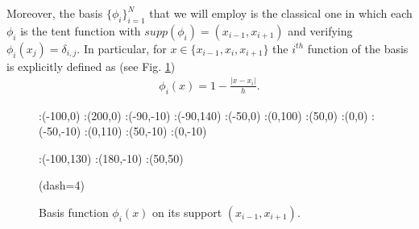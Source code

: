 Moreover, the basis $\big\{\phi_i\big\}_{i=1}^N$ that we will employ is the classical one in which each $\phi_i$ is the tent function with $supp(\phi_i)=(x_{i-1},x_{i+1})$ and verifying $\phi_i(x_j)=\delta_{i,j}$. In particular, for $x\in\{x_{i-1},x_i,x_{i+1}\}$ the $i^{th}$ function of the basis is explicitly defined as (see Fig. \ref{basis}) 
\begin{align}\label{basis_fun}
	\phi_i(x)= 1-\frac{|x-x_i|}{h}.
\end{align} 

\begin{figure}[h]
\figinit{0.7pt}
:(-100,0) :(200,0)
:(-90,-10) :(-90,140)
:(-50,0) :(0,100) 
:(50,0) :(0,0)
%
:(-50,-10) :(0,110) 
:(50,-10) :(0,-10)

:(-100,130) :(180,-10)
:(50,50)

\figdrawbegin{}
\figdrawarrow[1,2]
\figdrawline[3,4]
\figdrawline[4,5]
\figset(dash=4)
\figdrawline[4,6]
\figdrawarrow[11,12]

\figdrawend

\centerline{\box\figBoxA}
\caption{Basis function $\phi_i(x)$ on its support $(x_{i-1},x_{i+1})$.}\label{basis}
\end{figure}

